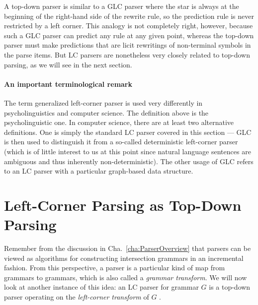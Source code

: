 A top-down parser is similar to a GLC parser where the star is always at the beginning of the right-hand side of the rewrite rule, so the prediction rule is never restricted by a left corner.
This analogy is not completely right, however, because such a GLC parser can predict any rule at any given point, whereas the top-down parser must make predictions that are licit rewritings of non-terminal symbols in the parse items.
But LC parsers are nonetheless very closely related to top-down parsing, as we will see in the next section.

\paragraph{An important terminological remark} The term generalized left-corner parser is used very differently in psycholinguistics and computer science.
The definition above is the psycholinguistic one.
In computer science, there are at least two alternative definitions.
One is simply the standard LC parser covered in this section --- GLC is then used to distinguish it from a so-called deterministic left-corner parser (which is of little interest to us at this point since natural language sentences are ambiguous and thus inherently non-deterministic).
The other usage of GLC refers to an LC parser with a particular graph-based data structure.


\section{Left-Corner Parsing as Top-Down Parsing} 
\label{sec:LC_GrammarTransform}
Remember from the discussion in Cha.~\ref{cha:ParserOverview} that parsers can be viewed as algorithms for constructing intersection grammars in an incremental fashion.
From this perspective, a parser is a particular kind of map from grammars to grammars, which is also called a \emph{grammar transform}.
We will now look at another instance of this idea: an LC parser for grammar $G$ is a top-down parser operating on the \emph{left-corner transform} of $G$ \citep{RosenkrantzLewis70,AhoUllman72}.


